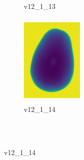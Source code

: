 \documentclass[11pt]{article}
\begin{document}
\begin{figure}
\begin{subfigure}[b]{0.15\textwidth}
        \caption{v12\_1\_13}
         \label{fig:five over x}
     \end{subfigure}
     \hfill
    \begin{subfigure}[b]{0.15\textwidth}
         \centering
         \includegraphics[width=3cm, height=4.5cm]{images/kartofler/v12_1_14_cut.png}
        \caption{v12\_1\_14}
         \label{fig:five over x}
     \end{subfigure}
     
     
     \\ \\
     

\end{figure}
\end{document}
